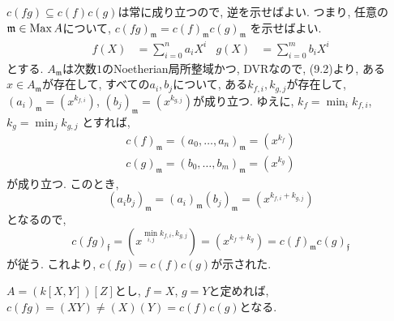 \documentclass[dvipdfmx]{jsarticle}
\begin{document}
    \begin{problem}
        $c(fg) \subseteq c(f)c(g)$は常に成り立つので, 逆を示せばよい.
        つまり, 任意の$\mathfrak{m} \in \operatorname{Max}{A}$について, $c(fg)_\mathfrak{m} = c(f)_\mathfrak{m}c(g)_\mathfrak{m}$
        を示せばよい.
        \begin{align*}
            f(X) &= \sum_{i = 0}^n a_i X^i & g(X) &= \sum_{i = 0}^m b_iX^i
        \end{align*}
        とする.
        $A_\mathfrak{m}$は次数$1$のNoetherian局所整域かつ, DVRなので, (9.2)より,
        ある$x \in A_\mathfrak{m}$が存在して, すべての$a_i, b_j$について, ある$k_{f,i}, k_{g, j}$が存在して,
        $(a_i)_\mathfrak{m} = (x^{k_{f,i}})$,
        $(b_j)_\mathfrak{m} = (x^{k_{g, j}})$が成り立つ.
        ゆえに, $k_f = \min_{i}{k_{f,i}}$, $k_g = \min_{j}{k_{g, j}}$
        とすれば,
        \begin{align*}
            c(f)_\mathfrak{m} = (a_0, \dots, a_n)_\mathfrak{m} = (x^{k_f})\\
            c(g)_\mathfrak{m} = (b_0, \dots, b_m)_\mathfrak{m} = (x^{k_g})
        \end{align*}
        が成り立つ.
        このとき,
        \[
            (a_ib_j)_\mathfrak{m} = (a_i)_\mathfrak{m}(b_j)_\mathfrak{m} = (x^{k_{f,i} + k_{g,j}})
        \]
        となるので,
         \[
            c(fg)_\mathfrak{f} = (x^{\min_{i,j}{k_{f,i}, k_{g,j}}}) = (x^{k_f + k_g})= c(f)_\mathfrak{m}c(g)_\mathfrak{f}
        \]
        が従う.
        これより, $c(fg) = c(f)c(g)$が示された.
    \end{problem}

    \begin{note}
        $A = (k[X, Y])[Z]$とし, $f = X$, $g = Y$と定めれば,
        $c(fg) = (XY) \neq (X)(Y) = c(f)c(g)$となる.
    \end{note}
\end{document}

